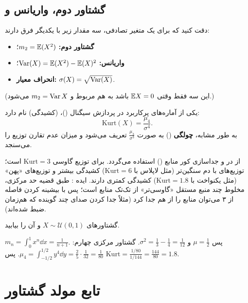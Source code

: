 \subsection{گشتاور دوم، واریانس و }
دقت کنید که برای یک متغیر تصادفی، سه مقدار زیر با یکدیگر فرق دارند:
\begin{itemize}
\item \textbf{گشتاور دوم:} $m_2=\mathbb{E}(X^2)$؛
\item \textbf{واریانس:} $\operatorname{Var}(X)=\mathbb{E}(X^2)-\mathbb{E}(X)^2$؛
\item \textbf{انحراف معیار:} $\sigma(X)=\sqrt{\operatorname{Var}(X)}$.
\end{itemize}
(این سه فقط وقتی $\mathbb{E} X=0$ باشد به هم مربوط و $m_2=\operatorname{Var} X$ می‌شود.)

\begin{definition}
یکی از آماره‌های پرکاربرد در پردازش سیگنال ()، \textcolor{red!70!black}{} (کشیدگی) نام دارد:
\[
\mathrm{Kurt}(X)=\frac{\mu_4}{\sigma^4}.
\]
به طور مشابه، \textbf{چولگی} () به صورت $\frac{\mu_3}{\sigma^3}$ تعریف می‌شود و میزان عدم تقارن توزیع را می‌سنجد.
\end{definition}

از  در  و جداسازی کور منابع () استفاده می‌گردد. برای توزیع گاوسی $\mathrm{Kurt}=3$ است؛ توزیع‌های با دم سنگین‌تر (مثل لاپلاس با $\mathrm{Kurt}=6$) کشیدگی بیشتر و توزیع‌های «پهن» (مثل یکنواخت با $\mathrm{Kurt}=1.8$) کشیدگی کمتری دارند. ایده : طبق قضیه حد مرکزی، مخلوط چند منبع مستقل «گاوسی‌تر» از تک‌تک منابع است؛ پس با بیشینه کردن فاصله  از ۳ می‌توان منابع را از هم جدا کرد (مثلاً جدا کردن صدای چند گوینده که هم‌زمان ضبط شده‌اند).

\begin{example}
گشتاورهای $X\sim\mathcal U(0,1)$ و  آن را بیابید.
\begin{solution}
$m_n=\int_0^1x^n\dd x=\frac{1}{n+1}$. پس $\mu=\frac12$ و $\sigma^2=\frac13-\frac14=\frac1{12}$.
گشتاور مرکزی چهارم: $\mu_4=\int_{-1/2}^{1/2}y^4\dd y=\frac{2}{5}\cdot\frac{1}{32}=\frac1{80}$. پس
$\mathrm{Kurt}=\frac{1/80}{1/144}=\frac{144}{80}=1.8$.
\end{solution}
\end{example}

\section[تابع مولد گشتاور \lr{(MGF)}]{تابع مولد گشتاور {\large{}}}

